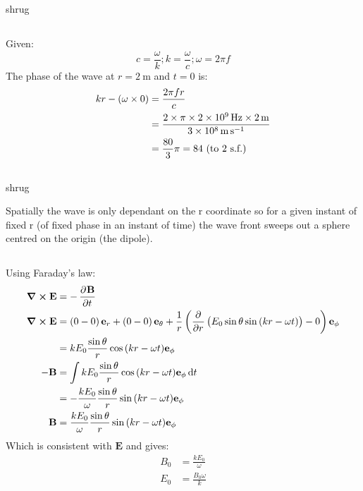 shrug
\subsection{}
Given:
\begin{equation*}
    c = \frac{\omega}{k}; k = \frac{\omega}{c}; \omega = 2 \pi f
\end{equation*}
The phase of the wave at $ r = \SI{2}{\metre} $ and $ t = 0 $ is:
\begin{align*}
    kr - \del{\omega \times 0} & = \frac{2 \pi fr}{c}\\
    & = \frac{2 \times \pi \times \SI{2e9}{\hertz} \times \SI{2}{\metre}}{\SI{3e8}{\metre\second\tothe{-1}}}\\
    & = \frac{80}{3} \pi = 84 \textrm{ (to 2 s.f.)}
\end{align*}

\subsection{}
shrug

Spatially the wave is only dependant on the r coordinate so for a given instant of fixed r (of fixed phase in an instant of time) the wave front sweeps out a sphere centred on the origin (the dipole).

\subsection{}
Using Faraday's law:
\begin{align*}
    \curl{\mathbf{E}} & = - \dpd{\mathbf{B}}{t}\\
    \curl{\mathbf{E}} & = \del{0 - 0}\mathbf{e}_r + \del{0 - 0}\mathbf{e}_{\theta} + \frac{1}{r}\del{\dpd{}{r} \del{E_0 \sin{\theta}\sin{\del{kr - \omega t}}} - 0}\mathbf{e}_{\phi}\\
    & = k E_0 \frac{\sin{\theta}}{r} \cos{\del{kr - \omega t}}\mathbf{e}_{\phi}\\
    - \mathbf{B} & = \int k E_0 \frac{\sin{\theta}}{r} \cos{\del{kr - \omega t}}\mathbf{e}_{\phi} \dif t\\
    & = - \frac{k E_0}{\omega} \frac{\sin{\theta}}{r} \sin{\del{kr - \omega t}} \mathbf{e}_{\phi}\\
    \mathbf{B} & = \frac{k E_0}{\omega} \frac{\sin{\theta}}{r} \sin{\del{kr - \omega t}} \mathbf{e}_{\phi}
\end{align*}
Which is consistent with $ \mathbf{E} $ and gives:
\begin{align*}
    B_0 & = \frac{k E_0}{\omega}\\
    E_0 & = \frac{B_0 \omega}{k}
\end{align*}

